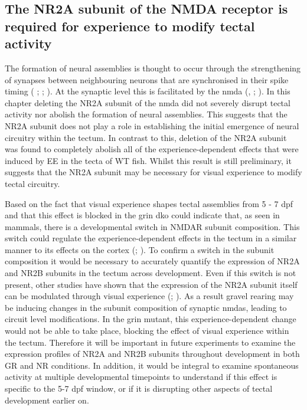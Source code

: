 \subsection{The NR2A subunit of the NMDA receptor is required for experience to modify tectal activity}

The formation of neural assemblies is thought to occur through the strengthening of synapses between neighbouring neurons that are synchronised in their spike timing (\cite{Hebb1949} ; \cite{Sejnowski1999}; \cite{Carrillo-Reid2016}). At the synaptic level this is facilitated by the \gls{nmda} (\cite{Feldman2012}, \cite{Zhang1998ASynapses}; \cite{Mu2006SpikeSystem}). In this chapter deleting the NR2A subunit of the \gls{nmda} did not severely disrupt tectal activity nor abolish the formation of neural assemblies. This suggests that the NR2A subunit does not play a role in establishing the initial emergence of neural circuitry within the tectum. In contrast to this, deletion of the NR2A subunit was found to completely abolish all of the experience-dependent effects that were induced by EE in the tecta of WT fish. Whilst this result is still preliminary, it suggests that the NR2A subunit may be necessary for visual experience to modify tectal circuitry. 

Based on the fact that visual experience shapes tectal assemblies from 5 - 7 dpf and that this effect is blocked in the \gls{grin} \gls{dko} could indicate that, as seen in mammals, there is a developmental switch in NMDAR subunit composition. This switch   could regulate the experience-dependent effects in the tectum in a similar manner to its effects on the cortex (\cite{Yashiro2008RegulationMetaplasticity}; \cite{Fagiolini2003SeparableSignaling}). To confirm a switch in the subunit composition it would be necessary to accurately quantify the expression of NR2A and NR2B subunits in the tectum across development.  Even if this switch is not present, other studies have shown that the expression of the NR2A subunit itself can be modulated through visual experience (\cite{Philpot2001VisualCortex}; \cite{Carmignoto1992Activity-dependentCortex}).  As a result gravel rearing may be inducing changes in the subunit composition of synaptic \gls{nmda}s, leading to circuit level modifications. In the \gls{grin} mutant, this experience-dependent change would not be able to take place, blocking the effect of visual experience within the tectum.  Therefore it will be important in future experiments to examine the expression profiles of NR2A and NR2B subunits throughout development in both GR and NR conditions. In addition, it would be integral to examine spontaneous activity at multiple developmental timepoints to understand if this effect is specific to the 5-7 dpf window, or if it is disrupting other aspects of tectal development earlier on. 

